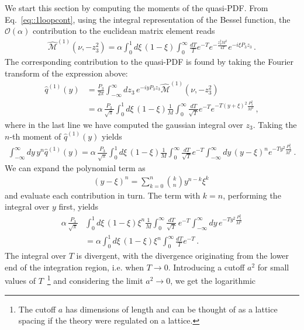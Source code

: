 We start this section by computing the moments of the quasi-PDF. From
Eq.~\eqref{eq::1loopcont}, using the integral representation of the Bessel
function, the $\mathcal{O}\left(\alpha\right)$ contribution to the euclidean
matrix element reads
 \begin{align}
    \hat{\mathcal{M}}^{(1)}\left(\nu, -z_3^2\right) = 
    \alpha\int_0^{1} d\xi \, \left(1-\xi\right) \int_0^{\infty}\frac{dT}{T} e^{-T} e^{-\frac{z_3^2 M^2}{4T}} e^{-i\xi P_3 z_3}\, .
\end{align}
The corresponding contribution to the quasi-PDF is found by taking the Fourier
transform of the expression above:
\begin{align}
    \hat{q}^{(1)}\left(y\right) &= 
    \frac{P_3}{2\pi}\int_{-\infty}^{\infty}d z_3\, e^{-i y P_3 z_3 } \hat{\mathcal{M}}^{(1)}\left(\nu, -z_3^2\right) \\
    & = \alpha\,\frac{P_3}{\sqrt{\pi}}\int_0^1 d\xi \, \left(1-\xi\right)\frac{1}{M} 
	\int_0^{\infty} \frac{dT}{\sqrt{T}}e^{-T} e^{-T\left(y+\xi\right)^2 \frac{P_3^2}{M^2}}\, ,
\end{align}
where in the last line we have computed the gaussian integral over $z_3$.
Taking the $n$-th moment of $\hat{q}^{(1)}\left(y\right)$ yields
\begin{align}
    \int_{-\infty}^{\infty} dy\, y^n \hat{q}^{(1)}\left(y\right) =
	\alpha\,\frac{P_3}{\sqrt{\pi}}\int_0^1 d\xi \, \left(1-\xi\right)
	\frac{1}{M} \int_0^{\infty} \frac{dT}{\sqrt{T}}e^{-T}
	\int_{-\infty}^{\infty} dy\, 
	\left(y-\xi\right)^n e^{-T y^2 \frac{P_3^2}{M^2}}\, .
\end{align}
We can expand the polynomial term as
\begin{align}
	\left(y-\xi\right)^n = \sum_{k=0}^{n}\binom{k}{n}y^{n-k}\xi^k\
\end{align}
and evaluate each contribution in turn. The term with $k=n$, performing the
integral over $y$ first, yields
\begin{align}
	 \alpha\,\frac{P_3}{\sqrt{\pi}}&\int_0^1 d\xi\, 
	 \left(1-\xi\right) \xi^n \frac{1}{M}
	 \int_0^{\infty} \frac{dT}{\sqrt{T}}\, e^{-T } 
	 \int_{-\infty}^{\infty} dy\, e^{-T y^2 \frac{P_3^2}{M^2}}  \\
	 & = \alpha \int_0^1 d\xi\, 
	 \left(1-\xi\right) \xi^n \int_0^{\infty} \frac{dT}{T}e^{-T}\, . 
\end{align}
The integral over $T$ is divergent, with the divergence originating from the
lower end of the integration region, i.e. when $T\to 0$. Introducing a cutoff
$a^2$ for small values of $T$~\footnote{The cutoff $a$ has dimensions of length
and can be thought of as a lattice spacing if the theory were regulated on a
lattice.} and considering the limit $a^2 \rightarrow 0$, we get the logarithmic
